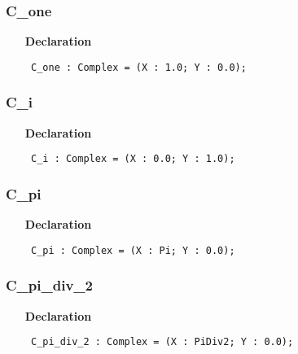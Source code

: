 \documentclass[12pt,a4paper,oneside]{report}
\newcommand{\declarationitem}[1]{\textbf{#1}}
\newcommand{\code}[1]{\texttt{#1}}
\begin{document}
\subsubsection{C{\_}one}
\label{utypes-C_one}
\begin{itemize}\item[\declarationitem{Declaration}\hfill]
	\begin{flushleft}
		\code{
			C{\_}one      : Complex = (X : 1.0;    Y : 0.0);}
		
	\end{flushleft}
	
\end{itemize}
\subsubsection{C{\_}i}
\label{utypes-C_i}
\begin{itemize}\item[\declarationitem{Declaration}\hfill]
	\begin{flushleft}
		\code{
			C{\_}i        : Complex = (X : 0.0;    Y : 1.0);}
		
	\end{flushleft}
	
\end{itemize}
\subsubsection{C{\_}pi}
\label{utypes-C_pi}
\begin{itemize}\item[\declarationitem{Declaration}\hfill]
	\begin{flushleft}
		\code{
			C{\_}pi       : Complex = (X : Pi;     Y : 0.0);}
		
	\end{flushleft}
	
\end{itemize}
\subsubsection{C{\_}pi{\_}div{\_}2}
\label{utypes-C_pi_div_2}
\begin{itemize}\item[\declarationitem{Declaration}\hfill]
	\begin{flushleft}
		\code{
			C{\_}pi{\_}div{\_}2 : Complex = (X : PiDiv2; Y : 0.0);}
		
	\end{flushleft}
	
\end{itemize}
\end{document}
